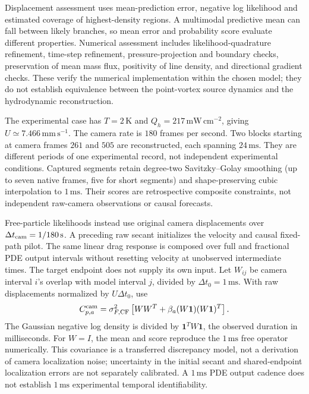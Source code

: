 \documentclass[11pt]{article}
\numberwithin{equation}{section}
\begin{document}
Displacement assessment uses mean-prediction error, negative log likelihood and estimated coverage of highest-density regions. A multimodal predictive mean can fall between likely branches, so mean error and probability score evaluate different properties. Numerical assessment includes likelihood-quadrature refinement, time-step refinement, pressure-projection and boundary checks, preservation of mean mass flux, positivity of line density, and directional gradient checks. These verify the numerical implementation within the chosen model; they do not establish equivalence between the point-vortex source dynamics and the hydrodynamic reconstruction.

The experimental case has $T=2\,\mathrm K$ and $Q_h=217\,\mathrm{mW\,cm^{-2}}$, giving $U\simeq7.466\,\mathrm{mm\,s^{-1}}$. The camera rate is $180$ frames per second. Two blocks starting at camera frames $261$ and $505$ are reconstructed, each spanning $24\,\mathrm{ms}$. They are different periods of one experimental record, not independent experimental conditions. Captured segments retain degree-two Savitzky--Golay smoothing (up to seven native frames, five for short segments) and shape-preserving cubic interpolation to $1\,\mathrm{ms}$. Their scores are retrospective composite constraints, not independent raw-camera observations or causal forecasts.

Free-particle likelihoods instead use original camera displacements over $\Delta t_{\rm cam}=1/180\,\mathrm s$. A preceding raw secant initializes the velocity and causal fixed-path pilot. The same linear drag response is composed over full and fractional PDE output intervals without resetting velocity at unobserved intermediate times. The target endpoint does not supply its own input. Let $W_{ij}$ be camera interval $i$'s overlap with model interval $j$, divided by $\Delta t_0=1\,\mathrm{ms}$. With raw displacements normalized by $U\Delta t_0$, use
\begin{equation}
 C^{\rm cam}_{p,a}=\sigma_{F,\rm CF}^2
 \left[WW^T+\beta_a(W\mathbf1)(W\mathbf1)^T\right].
 \label{eq:nativecovariance}
\end{equation}
The Gaussian negative log density is divided by $\mathbf1^TW\mathbf1$, the observed duration in milliseconds. For $W=I$, the mean and score reproduce the $1\,\mathrm{ms}$ free operator numerically. This covariance is a transferred discrepancy model, not a derivation of camera localization noise; uncertainty in the initial secant and shared-endpoint localization errors are not separately calibrated. A $1\,\mathrm{ms}$ PDE output cadence does not establish $1\,\mathrm{ms}$ experimental temporal identifiability.
\end{document}
